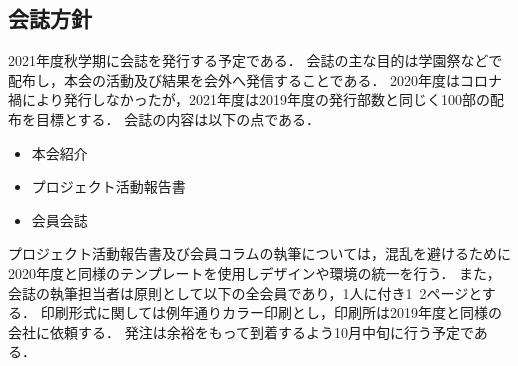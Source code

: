 \subsection*{会誌方針}


2021年度秋学期に会誌を発行する予定である．
会誌の主な目的は学園祭などで配布し，本会の活動及び結果を会外へ発信することである．
2020年度はコロナ禍により発行しなかったが，2021年度は2019年度の発行部数と同じく100部の配布を目標とする．
会誌の内容は以下の点である．
\begin{itemize}
	\item 本会紹介
	\item プロジェクト活動報告書
	\item 会員会誌
\end{itemize}
プロジェクト活動報告書及び会員コラムの執筆については，混乱を避けるために2020年度と同様のテンプレートを使用しデザインや環境の統一を行う．
また，会誌の執筆担当者は原則として\thirdGrade{}以下の全会員であり，1人に付き1~2ページとする．
印刷形式に関しては例年通りカラー印刷とし，印刷所は2019年度と同様の会社に依頼する．
発注は余裕をもって到着するよう10月中旬に行う予定である．
